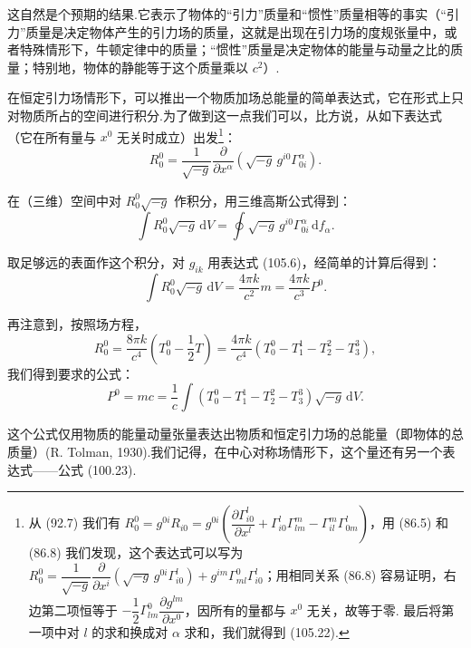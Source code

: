 这自然是个预期的结果.它表示了物体的“引力”质量和“惯性”质量相等的事实（“引力”质量是决定物体产生的引力场的质量，这就是出现在引力场的度规张量中，或者特殊情形下，牛顿定律中的质量；“惯性”质量是决定物体的能量与动量之比的质量；特别地，物体的静能等于这个质量乘以 $c^{2}$）.

在恒定引力场情形下，可以推出一个物质加场总能量的简单表达式，它在形式上只对物质所占的空间进行积分.为了做到这一点我们可以，比方说，从如下表达式（它在所有量与 $x^0$ 无关时成立）出发\footnote{从 (92.7) 我们有 $R_{0}^{0}=g^{0i}R_{i0}=g^{0i}\left(\dfrac{\partial\Gamma_{i0}^{l}}{\partial x^{l}}+\Gamma_{i0}^{l}\Gamma_{lm}^{m}-\Gamma_{il}^{m}\Gamma_{0m}^{l}\right)$，用 (86.5) 和 (86.8) 我们发现，这个表达式可以写为 $R_{0}^{0}=\dfrac{1}{\sqrt{-g}}\dfrac{\partial}{\partial x^{i}}\left(\sqrt{-g}\,g^{0i}\Gamma_{i0}^{l}\right)+g^{im}\Gamma_{ml}^{0}\Gamma_{i0}^{l}$；用相同关系 (86.8) 容易证明，右边第二项恒等于 $-\dfrac{1}{2}\Gamma_{lm}^{0}\dfrac{\partial g^{lm}}{\partial x^{0}}$，因所有的量都与 $x^{0}$ 无关，故等于零. 最后将第一项中对 $l$ 的求和换成对 $\alpha$ 求和，我们就得到 (105.22).}：
\begin{equation}
  R_0^0=\frac{1}{\sqrt{-g}}
  \frac{\partial}{\partial x^{\alpha}}
  \left(\sqrt{-g}\,g^{i0}\Gamma_{0i}^{\alpha}\right).
\end{equation}

在（三维）空间中对 $R_0^0\sqrt{-g}$ 作积分，用三维高斯公式得到：
\begin{equation*}
  \int R_0^0\sqrt{-g}\,\mathrm{d}V
  =\oint\sqrt{-g}\,g^{i0}\Gamma_{0i}^{\alpha}\,\mathrm{d}f_{\alpha}.
\end{equation*}

取足够远的表面作这个积分，对 $g_{ik}$ 用表达式 (105.6)，经简单的计算后得到：
\begin{equation*}
  \int R_0^0\sqrt{-g}\,\mathrm{d}V
  =\frac{4\pi k}{c^{2}}m
  =\frac{4\pi k}{c^{3}}P^{0}.
\end{equation*}

再注意到，按照场方程，
\begin{equation*}
  R_0^0=\frac{8\pi k}{c^{4}}\left(T_0^0-\frac{1}{2}T\right)
  =\frac{4\pi k}{c^{4}}(T_0^0-T_1^1-T_2^2-T_3^3),
\end{equation*}
我们得到要求的公式：
\begin{equation}
  P^{0}=mc
  =\frac{1}{c}\int(T_0^0-T_1^1-T_2^2-T_3^3)\sqrt{-g}\,\mathrm{d}V.
\end{equation}

这个公式仅用物质的能量动量张量表达出物质和恒定引力场的总能量（即物体的总质量）(R. Tolman, 1930).我们记得，在中心对称场情形下，这个量还有另一个表达式——公式 (100.23).


